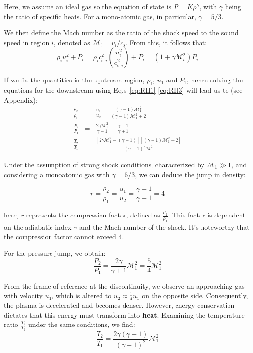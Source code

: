 Here, we assume an ideal gas so the equation of state is \( P = K \rho^\gamma \), with \( \gamma \) being the ratio of specific heats. For a mono-atomic gas, in particular, \( \gamma = 5/3 \).

We then define the Mach number as the ratio of the shock speed to the sound speed in region \( i \), denoted as \( \mathcal{M}_i = v_i / c_{\text{s}} \). From this, it follows that:
%
\begin{equation}
\rho_i u_i^2 + P_i = \rho_i c_{\text{s}, i}^2 \left( \frac{u_i^2}{c_{\text{s},i}^2} \right) + P_i = (1 + \gamma \mathcal{M}_i^2) P_i
\end{equation}

If we fix the quantities in the upstream region,  $\rho_1$,  $u_1$ and $P_1$, hence solving the equations for the downstream using Eq.s~\ref{eq:RH1}-\ref{eq:RH3} will lead us to (see Appendix):
%
\begin{eqnarray}
\frac{\rho_2}{\rho_1} & = & \frac{u_1}{u_2}=\frac{(\gamma +1) \mathcal M_1^2}{(\gamma - 1) \mathcal M_1^2+2} \\
\frac{P_2}{P_1} & = & \frac{2\gamma \mathcal M_1^2}{\gamma +1}-\frac{\gamma -1}{\gamma +1} \\
\frac{T_2}{T_1} & = & \frac{\left[2\gamma \mathcal M_1^2 -(\gamma - 1) \right] \left[ (\gamma - 1) \mathcal M_1^2 + 2 \right]}{(\gamma + 1)^2 \mathcal M_1^2}
\end{eqnarray}

Under the assumption of strong shock conditions, characterized by \( \mathcal{M}_1 \gg 1 \), and considering a monoatomic gas with \( \gamma = 5/3 \), we can deduce the jump in density:
%
\begin{remark}
\begin{equation}
r = \frac{\rho_2}{\rho_1} = \frac{u_1}{u_2} = \frac{\gamma + 1}{\gamma - 1} = 4
\end{equation}
\end{remark}
%
here, \( r \) represents the compression factor, defined as \( \frac{\rho_2}{\rho_1} \). This factor is dependent on the adiabatic index \( \gamma \) and the Mach number of the shock. It's noteworthy that the compression factor cannot exceed 4.

For the pressure jump, we obtain:
%
\begin{equation}
\frac{P_2}{P_1} = \frac{2 \gamma}{\gamma + 1} \mathcal{M}_1^2 = \frac{5}{4} \mathcal{M}_1^2 
\end{equation}

From the frame of reference at the discontinuity, we observe an approaching gas with velocity \( u_1 \), which is altered to \( u_2 \approx \frac{1}{4}u_1 \) on the opposite side. Consequently, the plasma is decelerated and becomes denser.
%
However, energy conservation dictates that this energy must transform into \textbf{heat}. Examining the temperature ratio \( \frac{T_2}{T_1} \) under the same conditions, we find:
%
\begin{equation}
\frac{T_2}{T_1} = \frac{2 \gamma (\gamma - 1)}{(\gamma +1)^2} \mathcal{M}_1^2
\end{equation}

